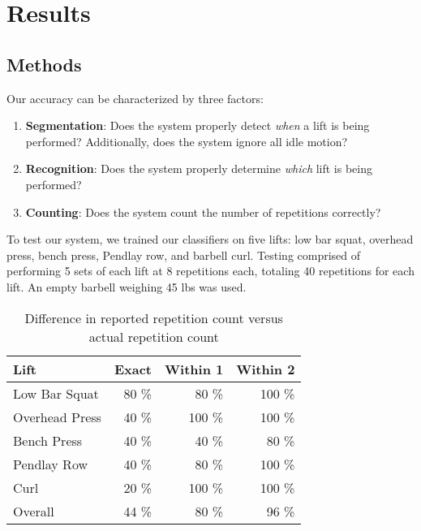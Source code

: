 \chapter{Results}


\section{Methods}
Our accuracy can be characterized by three factors:

\begin{enumerate}
    \item \textbf{Segmentation}: Does the system properly detect \textit{when} a lift is being performed? Additionally, does the system ignore all idle motion?
    \item \textbf{Recognition}: Does the system properly determine \textit{which} lift is being performed?
    \item \textbf{Counting}: Does the system count the number of repetitions correctly?
\end{enumerate}

To test our system, we trained our classifiers on five lifts: low bar squat, overhead press, bench press, Pendlay row, and barbell curl. Testing comprised of performing 5 sets of each lift at 8 repetitions each, totaling 40 repetitions for each lift. An empty barbell weighing 45 lbs was used. 

\begin{table}
    \centering
    \begin{tabular}{l r r r}
        \toprule
        Lift           & Exact   & Within 1 & Within 2 \\
        \midrule[\heavyrulewidth]
        Low Bar Squat  & 80 \%    & 80 \%     & 100 \% \\
        Overhead Press & 40 \%    & 100 \%    & 100 \% \\
        Bench Press    & 40 \%    & 40 \%     & 80 \%  \\
        Pendlay Row    & 40 \%    & 80 \%     & 100 \% \\
        Curl           & 20 \%    & 100 \%    & 100 \% \\
        \midrule
        Overall        & 44 \%   & 80 \%      & 96 \%  \\
        \bottomrule
    \end{tabular}
    \caption{Difference in reported repetition count versus actual repetition count}
\end{table}

